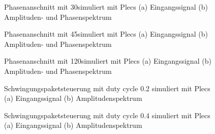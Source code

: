 \begin{appendix}
\begin{figure}[ht!]
	\centering
	\qquad
	\caption{Phasenanschnitt mit 30\textdegree simuliert mit Plecs (a) Eingangssignal (b) Amplituden- und Phasenspektrum}
	\label{fig:Plecs_mit_phasenanschnitt_30}
\end{figure}

\newpage

\begin{figure}[ht!]
	\centering
	\qquad
	\caption{Phasenanschnitt mit 45\textdegree simuliert mit Plecs (a) Eingangssignal (b) Amplituden- und Phasenspektrum}
	\label{fig:Plecs_mit_phasenanschnitt_45}
\end{figure}


\begin{figure}[ht!]
	\centering
	\qquad
	\caption{Phasenanschnitt mit 120\textdegree simuliert mit Plecs (a) Eingangssignal (b) Amplituden- und Phasenspektrum}
	\label{fig:Plecs_mit_phasenanschnitt_120}
\end{figure}


\begin{figure}[ht!]
	\centering
	\qquad
	\caption{Schwingungspaketsteuerung mit duty cycle 0.2 simuliert mit Plecs (a) Eingangssignal (b) Amplitudenspektrum}
	\label{fig:Schwingungspaketsteuerung_mit_duty_cycle_0_2 simuliert_mit_Plecs}
\end{figure}

\newpage

\begin{figure}[ht!]
	\centering
	\qquad
	\caption{Schwingungspaketsteuerung mit duty cycle 0.4 simuliert mit Plecs (a) Eingangssignal (b) Amplitudenspektrum}
	\label{fig:Schwingungspaketsteuerung_mit_duty_cycle_0_4 simuliert_mit_Plecs}
\end{figure}



\end{appendix}
